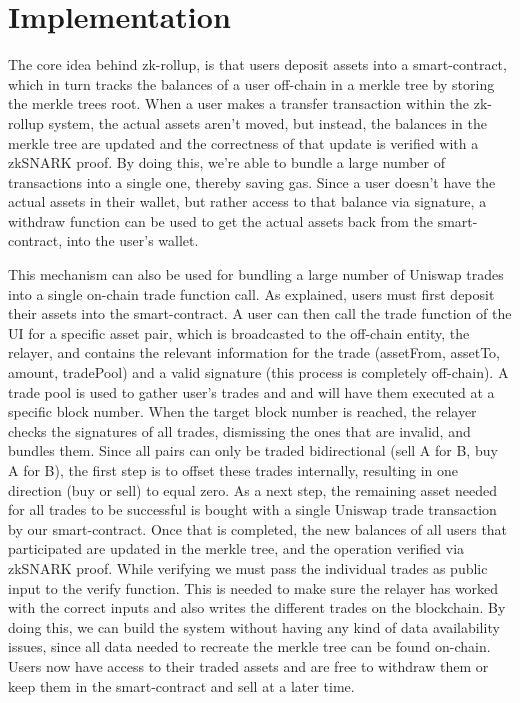 \documentclass[runningheads]{llncs}
\begin{document}
\section{Implementation}
The core idea behind zk-rollup, is that users deposit assets into a smart-contract, which in turn tracks the balances of a user off-chain in a merkle tree by storing the merkle trees root. When a user makes a transfer transaction within the zk-rollup system, the actual assets aren't moved, but instead, the balances in the merkle tree are updated and the correctness of that update is verified with a zkSNARK proof. By doing this, we’re able to bundle a large number of transactions into a single one, thereby saving gas. Since a user doesn’t have the actual assets in their wallet, but rather access to that balance via signature, a withdraw function can be used to get the actual assets back from the smart-contract, into the user's wallet. 

This mechanism can also be used for bundling a large number of  Uniswap trades into a single on-chain trade function call. As explained, users must first deposit their assets into the smart-contract. A user can then call the trade function of the UI for a specific asset pair, which is broadcasted to the off-chain entity, the relayer, and contains the relevant information for the trade (assetFrom, assetTo, amount, tradePool) and a valid signature (this process is completely off-chain). A trade pool is used to gather user's trades and and will have them executed at a specific block number. When the target block number is reached, the relayer checks the signatures of all trades, dismissing the ones that are invalid, and bundles them. Since all pairs can only be traded bidirectional (sell A for B, buy A for B), the first step is to offset these trades internally, resulting in one direction (buy or sell) to equal zero. As a next step, the remaining asset needed for all trades to be successful is bought with a single Uniswap trade transaction by our smart-contract. Once that is completed, the new balances of all users that participated are updated in the merkle tree, and the operation verified via zkSNARK proof. While verifying we must pass the individual trades as public input to the verify function. This is needed to make sure the relayer has worked with the correct inputs and also writes the different trades on the blockchain. By doing this, we can build the system without having any kind of data availability issues, since all data needed to recreate the merkle tree can be found on-chain. Users now have access to their traded assets and are free to withdraw them or keep them in the smart-contract and sell at a later time.
\end{document}
